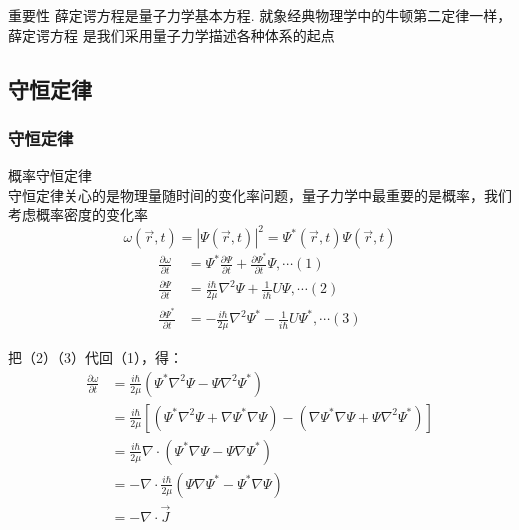 \begin{frame}
    \frametitle{}
    \centering
    \begin{atcbox}{重要性}
        {
      \large {薛定谔方程是量子力学基本方程. 就象经典物理学中的牛顿第二定律一样，薛定谔方程
      是我们采用量子力学描述各种体系的起点}
    }
    \end{atcbox}
    
\end{frame}

\subsection{守恒定律}

\begin{frame} 
    \frametitle{守恒定律 }
    {\Bullet} 概率守恒定律\\ \vspace{0.3em}
    守恒定律关心的是物理量随时间的变化率问题，量子力学中最重要的是概率，我们考虑概率密度的变化率
    $$\omega (\vec{r}, t)=|\Psi(\vec{r}, t)|^{2}=\Psi^{*}(\vec{r}, t) \Psi(\vec{r}, t)$$
    \begin{equation*}
        \begin{split}
            \frac{\partial \omega}{\partial t} &=\Psi^{*} \frac{\partial \Psi}{\partial t}+\frac{\partial \Psi^{*}}{\partial t} \Psi, \cdots (1) \\
            \frac{\partial \Psi}{\partial t} & =\frac{i \hbar}{2 \mu} \nabla^{2} \Psi+\frac{1}{i \hbar} U \Psi, \cdots (2) \\
            \frac{\partial \Psi^{*}}{\partial t} & =-\frac{i \hbar}{2 \mu} \nabla^{2} \Psi^{*}-\frac{1}{i \hbar} U \Psi^{*}, \cdots (3) 
        \end{split}
    \end{equation*}
\end{frame}

\begin{frame} 
    把（2）（3）代回（1），得：
    \begin{equation*}
        \begin{split}
        \frac{\partial \omega}{\partial t}
        &=\frac{i \hbar}{2 \mu}\left(\Psi^{*} \nabla^{2} \Psi-\Psi \nabla^{2} \Psi^{*}\right) \\
        &=\frac{i \hbar}{2 \mu}[(\Psi^{*} \nabla^{2} \Psi + \nabla \Psi^{*} \nabla \Psi)- (\nabla \Psi^{*} \nabla \Psi +\Psi \nabla^{2} \Psi^{*})] \\ 
        &=\frac{i \hbar}{2 \mu} \nabla \cdot\left(\Psi^{*} \nabla \Psi-\Psi \nabla \Psi^{*}\right)\\
        &=-\nabla \cdot \frac{i \hbar}{2 \mu} \left(\Psi \nabla \Psi^{*}-\Psi^{*} \nabla \Psi\right) \\
        &=-\nabla \cdot \vec{J}
        \end{split}
    \end{equation*}
\end{frame}

